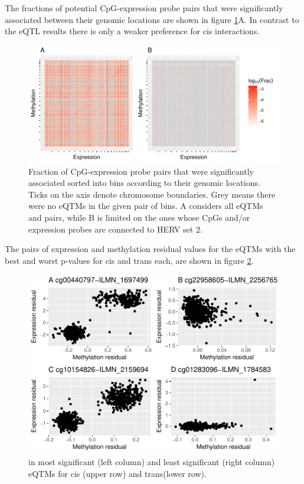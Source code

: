 \documentclass[a4paper,12pt,twoside,openright]{article}
\begin{document}
The fractions of potential CpG-expression probe pairs that were significantly associated between their genomic locations are shown in figure \ref{fig:global.eqtm.heatmap}A. In contrast to the eQTL results there is only a weaker preference for cis interactions. 

\begin{figure}[tb]
	\includegraphics[scale = 0.9, keepaspectratio = true]{../figures/eqtm_all_herv_heatmap}  
	\caption{Fraction of CpG-expression probe pairs that were significantly associated sorted into bins according to their genomic locations. Ticks on the axis denote chromosome boundaries. Grey means there were no eQTMs in the given pair of bins. A considers all eQTMs and pairs, while B is limited on the ones whose CpGs and/or expression probes are connected to HERV set 2.}
    \label{fig:global.eqtm.heatmap}
\end{figure}

The pairs of expression and methylation residual values for the eQTMs with the best and worst p-values for cis and trans each, are shown in figure \ref{fig:best.worst.eqtm.scatter}. 

\begin{figure}[tb]
	\includegraphics[scale = 1, keepaspectratio = true]{../figures/best_worst_eqtm_scatter}  
	\caption{ in most significant (left column) and least significant (right column) eQTMs for cis (upper row) and trans(lower row).}
    \label{fig:best.worst.eqtm.scatter}
\end{figure}
\end{document}
